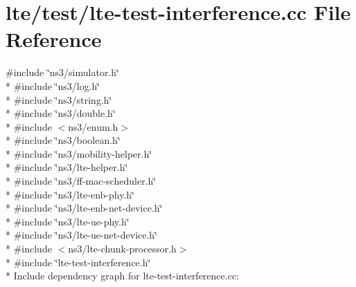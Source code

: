 \hypertarget{lte-test-interference_8cc}{}\section{lte/test/lte-\/test-\/interference.cc File Reference}
\label{lte-test-interference_8cc}
{\ttfamily \#include \char`\"{}ns3/simulator.\+h\char`\"{}}\\*
{\ttfamily \#include \char`\"{}ns3/log.\+h\char`\"{}}\\*
{\ttfamily \#include \char`\"{}ns3/string.\+h\char`\"{}}\\*
{\ttfamily \#include \char`\"{}ns3/double.\+h\char`\"{}}\\*
{\ttfamily \#include $<$ns3/enum.\+h$>$}\\*
{\ttfamily \#include \char`\"{}ns3/boolean.\+h\char`\"{}}\\*
{\ttfamily \#include \char`\"{}ns3/mobility-\/helper.\+h\char`\"{}}\\*
{\ttfamily \#include \char`\"{}ns3/lte-\/helper.\+h\char`\"{}}\\*
{\ttfamily \#include \char`\"{}ns3/ff-\/mac-\/scheduler.\+h\char`\"{}}\\*
{\ttfamily \#include \char`\"{}ns3/lte-\/enb-\/phy.\+h\char`\"{}}\\*
{\ttfamily \#include \char`\"{}ns3/lte-\/enb-\/net-\/device.\+h\char`\"{}}\\*
{\ttfamily \#include \char`\"{}ns3/lte-\/ue-\/phy.\+h\char`\"{}}\\*
{\ttfamily \#include \char`\"{}ns3/lte-\/ue-\/net-\/device.\+h\char`\"{}}\\*
{\ttfamily \#include $<$ns3/lte-\/chunk-\/processor.\+h$>$}\\*
{\ttfamily \#include \char`\"{}lte-\/test-\/interference.\+h\char`\"{}}\\*
Include dependency graph for lte-\/test-\/interference.cc\+:
